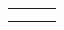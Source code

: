 \documentclass[10pt,a4paper]{article}
\begin{document}
\begin{tabular}{C{0.3090\textwidth} C{0.3075\textwidth} C{0.3065\textwidth}}
{%
\vspace*{0.345em}\\%
%
}& \shortstack[c]{
%
%
}
\end{tabular}
\end{document}
